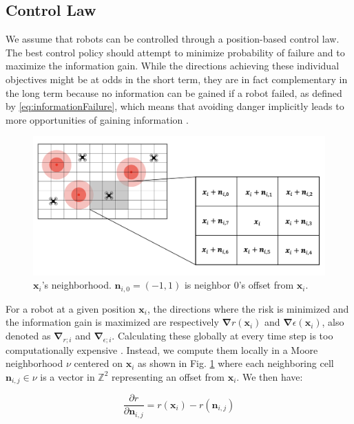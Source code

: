 \documentclass[letterpaper, 10 pt, conference]{ieeeconf}
\begin{document}
\subsection{Control Law}
We assume that robots can be controlled through a position-based
control law. The best control policy should attempt to minimize
probability of failure and to maximize the information gain. While the
directions achieving these individual objectives might be at odds in
the short term, they are in fact complementary in the long term
because no information can be gained if a robot failed, as defined by
\eqref{eq:informationFailure}, which means that avoiding danger
implicitly leads to more opportunities of gaining information
\cite{schwagerMultirobotControlPolicy2017}.

\begin{figure}[h]
	\centering
    \includegraphics[width=0.95\columnwidth]{images/Moore.png}
    \caption{$\bm{x}_i$'s neighborhood. $\bm{n}_{i,0} = (-1, 1)$ is neighbor 0's offset from $\bm{x}_i$.}
    \label{neighborhood}
\end{figure}

For a robot at a given position $\bm{x}_i$, the directions where the
risk is minimized and the information gain is maximized are
respectively $\bm{\nabla}r(\bm{x}_i)$ and
$\bm{\nabla}\epsilon(\bm{x}_i)$, also denoted as $\bm{\nabla}_{r;i}$
and $\bm{\nabla}_{\epsilon;i}$. Calculating these globally at every
time step is too computationally expensive
\cite{dames2012decentralized,schwagerMultirobotControlPolicy2017}. Instead,
we compute them locally in a Moore neighborhood $\nu$ centered on
$\bm{x}_i$ as shown in Fig. \ref{neighborhood} where each neighboring
cell $\bm{n}_{i,j} \in \nu$ is a vector in $\mathbb{Z}^2$ representing
an offset from $\bm{x}_i$. We then have:

\begin{equation}
    \frac{\partial r}{\partial \bm{n}_{i,j}} = r(\bm{x}_i) - r(\bm{n}_{i,j})
    \label{eq:neighbor}
\end{equation}
\end{document}
